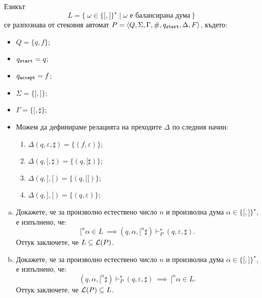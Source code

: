 \begin{example}
  Езикът
  \[L = \{\ \omega \in \{\texttt{[},\texttt{]}\}^\star \mid \omega\text{ е балансирана дума}\ \}\]
  се разпознава от стековия автомат $P = \langle{Q,\Sigma,\Gamma,\#,q_{\texttt{start}},\Delta,F}\rangle$, където:
  \begin{itemize}
  \item 
    $Q = \{q,f\}$;
  \item
    $q_{\texttt{start}} = q$;
  \item
    $q_{\texttt{accept}} = f$;
  \item
    $\Sigma = \{\texttt{[},\texttt{]}\}$;
  \item
    $\Gamma = \{\texttt{[}, \sharp\}$;
  \item
    Можем да дефинираме релацията на преходите $\Delta$ по следния начин:
    \begin{enumerate}[(1)]
    \item 
      $\Delta(q, \varepsilon, \sharp) = \{(f, \varepsilon)\}$;
    \item
      $\Delta(q, \texttt{[}, \sharp) = \{(q, \texttt{[}\sharp)\}$;
    \item
      $\Delta(q, \texttt{[}, \texttt{[}) = \{(q, \texttt{[[})\}$;
    \item
      $\Delta(q, \texttt{]}, \texttt{[}) = \{(q, \varepsilon)\}$;
    \end{enumerate}
  \end{itemize}  
  \begin{enumerate}[(a)]
  \item
    Докажете, че за произволно естествено число $n$ и произволна дума $\alpha \in \{\texttt{[}, \texttt{]}\}^\star$, 
    е изпълнено, че:
    \[\texttt{[}^n\alpha \in L\ \implies (q, \alpha, \texttt{[}^n\sharp) \vdash^\star_P (q, \varepsilon, \sharp).\]
    Оттук заключете, че $L \subseteq \mathcal{L}(P)$.
  \item
    Докажете, че за произволно естествено число $n$ и произволна дума $\alpha \in \{\texttt{[}, \texttt{]}\}^\star$, е изпълнено, че:
    \[(q,\alpha,\texttt{[}^n\sharp) \vdash^\star_P (q, \varepsilon, \sharp)\ \implies\ \texttt{[}^n\alpha \in L.\]
    Оттук заключете, че $\mathcal{L}(P) \subseteq L$.
  \end{enumerate}
\end{example}


